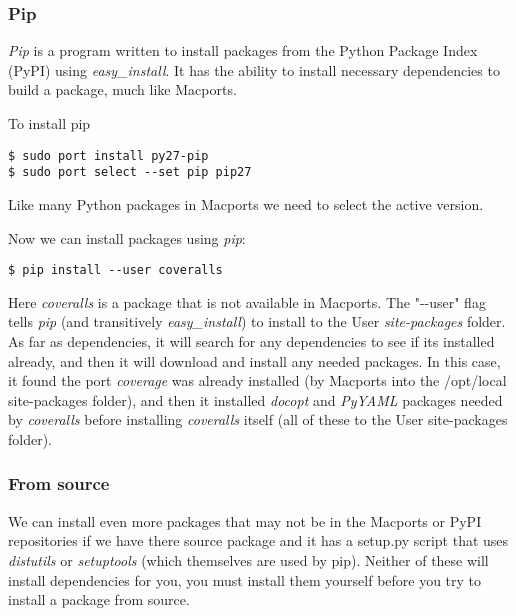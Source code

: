 \documentclass[11pt]{article}
\begin{document}
\subsubsection{Pip}
{\it Pip} is a program written to install packages from the Python Package Index (PyPI) using {\it easy\_install}. It has the ability to install necessary dependencies to build a package, much like Macports. 

To install pip
\begin{lstlisting}[style=Bash]
$ sudo port install py27-pip
$ sudo port select --set pip pip27
\end{lstlisting}
Like many Python packages in Macports we need to select the active version.

Now we can install packages using {\it pip}:
\begin{lstlisting}[style=Bash]
$ pip install --user coveralls
\end{lstlisting}
Here {\it coveralls} is a package that is not available in Macports. The "-{}-user" flag tells {\it pip} (and transitively {\it easy\_install}) to install to the User {\it site-packages} folder. As far as dependencies, it will search for any dependencies to see if its installed already, and then it will download and install any needed packages. In this case, it found the port {\it coverage} was already installed (by Macports into the /opt/local site-packages folder), and then it installed {\it docopt} and {\it PyYAML} packages needed by {\it coveralls} before installing {\it coveralls} itself (all of these to the User site-packages folder).



\subsubsection{From source}
We can install even more packages that may not be in the Macports or PyPI repositories if we have there source package and it has a setup.py script that uses {\it distutils} or {\it setuptools} (which themselves are used by pip). Neither of these will install dependencies for you, you must install them yourself before you try to install a package from source.
\end{document}
